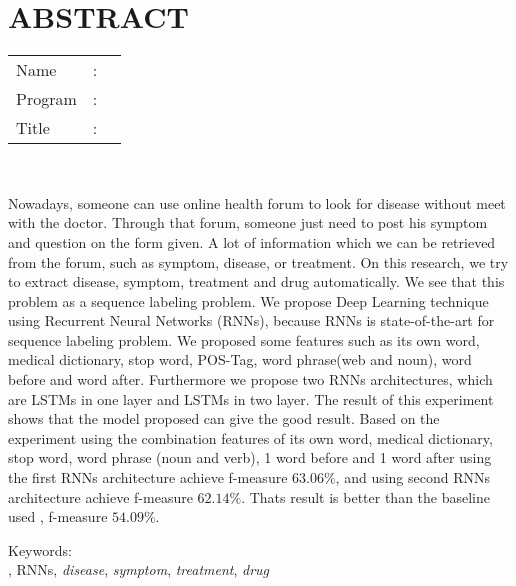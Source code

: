 %
%
%

\chapter*{ABSTRACT}

\vspace*{0.2cm}

\noindent \begin{tabular}{l l p{11.0cm}}
	Name&: & \penulis \\
	Program&: & \programEng \\
	Title&: & \judulInggris \\
\end{tabular} \\ 

\vspace*{0.5cm}

\noindent 

Nowadays, someone can use online health forum to look for disease without meet with the doctor. Through that forum, someone just need to post his symptom and question on the form given. A lot of information which we can be retrieved from the forum, such as symptom, disease, or treatment. On this research, we try to extract disease, symptom, treatment and drug automatically. We see that this problem as a sequence labeling problem. We propose Deep Learning technique using Recurrent Neural Networks (RNNs), because RNNs is state-of-the-art for sequence labeling problem. We proposed some features such as its own word, medical dictionary, stop word, POS-Tag, word phrase(web and noun), word before and word after. Furthermore  we propose two RNNs architectures, which are LSTMs in one layer and LSTMs in two layer. The result of this experiment shows that the model proposed can give the good result. Based on the experiment using the combination features of its own word, medical dictionary, stop word, word phrase (noun and verb), 1 word before and 1 word after  using the first RNNs architecture achieve f-measure $ 63.06\% $, and using second RNNs architecture achieve f-measure $ 62.14\% $. Thats result is better than the baseline used \citep{skripsiKakRadit}, f-measure $ 54.09\% $.


\vspace*{0.2cm}

\noindent Keywords: \\ 
\noindent \mer, RNNs, \textit{disease}, \textit{symptom}, \textit{treatment}, \textit{drug} \\ 

\newpage
